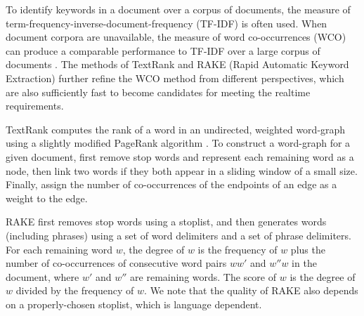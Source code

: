 \documentclass[a4paper,twoside]{article}
\begin{document}
To identify keywords in a document over a corpus of documents, the measure of term-frequency-inverse-document-frequency (TF-IDF) \cite{salton87} is often used.
When document corpora are unavailable,
the measure of word co-occurrences (WCO) can produce a %
comparable performance to TF-IDF over a large corpus of documents \cite{Matsuo:03}.
The methods of TextRank \cite{Mihalcea04} and RAKE (Rapid Automatic Keyword Extraction) \cite{Rose:10}
further refine the WCO method from different perspectives, %
which are also sufficiently fast to become candidates %
for meeting the realtime requirements. %

TextRank %
computes the rank of a word in an undirected, weighted word-graph using a slightly modified PageRank algorithm \cite{Brin:98}.
To construct a word-graph for a given document, first remove stop words and represent each remaining word
as a node, then link two words if they both appear in a sliding window of a small size. Finally,
assign the number of co-occurrences of the endpoints of an edge as a weight to the edge.

RAKE %
first removes stop words using a stoplist, and then generates words (including phrases) using a set of word delimiters and %
a set of phrase delimiters.
For each remaining word $w$, the degree of $w$ is the frequency of $w$ plus the number of co-occurrences of consecutive word pairs $ww'$ and $w''w$ in the document, where $w'$ and $w''$ are
remaining words.
The score of $w$ is the degree of $w$ divided by the frequency of $w$. We note that
the quality of RAKE also depends on a properly-chosen stoplist, which is language dependent.
%
\end{document}
